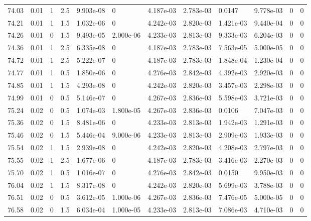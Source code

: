 \documentclass[preview]{standalone}
\begin{document}
{{{{{{{{{{{\begin{tabular}{L{1.2cm}C{1.2cm} C{0.3cm}C{0.5cm} C{1.4cm}C{1.4cm} C{1.4cm}C{1.4cm} C{1.6cm}C{1.6cm} C{1.6cm}C{1.6cm}}
  74.03  &  0.01  & 1     & 2.5 &  9.903e-08  & 0  &  4.187e-03&   2.783e-03& 0.0147 & 9.778e-03   &  0 & 0  \\ 
  74.21  &  0.01  & 1     & 1.5 &  1.032e-06  & 0  &  4.242e-03&   2.820e-03& 1.421e-03 & 9.440e-04   &  0 & 0  \\ 
  74.26  &  0.01  & 0     & 1.5 &  9.493e-05  & 2.000e-06  &  4.233e-03&   2.813e-03& 9.333e-03 & 6.204e-03   &  0 & 0  \\ 
  74.36  &  0.01  & 1     & 2.5 &  6.335e-08  & 0  &  4.187e-03&   2.783e-03& 7.563e-05 & 5.000e-05   &  0 & 0  \\ 
  74.72  &  0.01  & 1     & 2.5 &  5.222e-07  & 0  &  4.187e-03&   2.783e-03& 1.848e-04 & 1.230e-04   &  0 & 0  \\ 
  74.77  &  0.01  & 1     & 0.5 &  1.850e-06  & 0  &  4.276e-03&   2.842e-03& 4.392e-03 & 2.920e-03   &  0 & 0  \\ 
  74.85  &  0.01  & 1     & 1.5 &  4.293e-08  & 0  &  4.242e-03&   2.820e-03& 3.457e-03 & 2.298e-03   &  0 & 0  \\ 
  74.99  &  0.01  & 0     & 0.5 &  5.146e-07  & 0  &  4.267e-03&   2.836e-03& 5.598e-03 & 3.721e-03   &  0 & 0  \\ 
  75.24  &  0.02  & 0     & 0.5 &  1.074e-03  & 1.800e-05  &  4.267e-03&   2.836e-03& 0.0106 & 7.047e-03   &  0 & 0  \\ 
  75.36  &  0.02  & 0     & 1.5 &  8.481e-06  & 0  &  4.233e-03&   2.813e-03& 1.942e-03 & 1.291e-03   &  0 & 0  \\ 
  75.46  &  0.02  & 0     & 1.5 &  5.446e-04  & 9.000e-06  &  4.233e-03&   2.813e-03& 2.909e-03 & 1.933e-03   &  0 & 0  \\ 
  75.54  &  0.02  & 1     & 1.5 &  2.939e-08  & 0  &  4.242e-03&   2.820e-03& 4.208e-03 & 2.797e-03   &  0 & 0  \\ 
  75.55  &  0.02  & 1     & 2.5 &  1.677e-06  & 0  &  4.187e-03&   2.783e-03& 3.416e-03 & 2.270e-03   &  0 & 0  \\ 
  75.70  &  0.02  & 1     & 0.5 &  1.016e-07  & 0  &  4.276e-03&   2.842e-03& 0.0150 & 9.950e-03   &  0 & 0  \\ 
  76.04  &  0.02  & 1     & 1.5 &  8.317e-08  & 0  &  4.242e-03&   2.820e-03& 5.699e-03 & 3.788e-03   &  0 & 0  \\ 
  76.51  &  0.02  & 0     & 0.5 &  3.612e-05  & 1.000e-06  &  4.267e-03&   2.836e-03& 7.476e-05 & 5.000e-05   &  0 & 0  \\ 
  76.58  &  0.02  & 0     & 1.5 &  6.034e-04  & 1.000e-05  &  4.233e-03&   2.813e-03& 7.086e-03 & 4.710e-03   &  0 & 0  \\ 

\end{tabular}}}}}}}}}}}}
\end{document}
